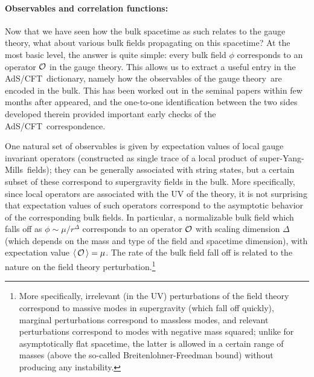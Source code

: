 \documentclass[12pt,a4paper]{article}
\def\AC{AdS/CFT}
\def\GT{gauge theory}
\def\SYM{super-Yang-Mills}
\def\vev#1{\langle\, #1 \, \rangle}
\begin{document}
\paragraph{Observables and correlation functions:}  %
Now that we have seen how the bulk spacetime as such relates to the  \GT, what about various bulk fields propagating on this spacetime?
At the most basic level, the answer is quite simple: every bulk field $\phi$ corresponds to an operator ${\cal O}$ in the \GT.
This allows us to extract a useful entry in the \AC\ dictionary, namely how the observables of the \GT\ are encoded in the bulk.  
This has been worked out in the seminal papers  \cite{Gubser:1998bc,Witten:1998qj} within few months after \cite{Maldacena:1997re} appeared, and the one-to-one identification between the two sides developed therein
provided important early checks of the \AC\ correspondence.

One natural set of observables is given by expectation values of local gauge invariant operators (constructed as single trace of a local product of \SYM\ fields); they can be generally associated with string states, but a certain subset of these correspond to supergravity fields in the bulk.  More specifically, since local operators are associated with the UV of the theory, it is not surprising that expectation values of such operators correspond to the asymptotic behavior of the corresponding bulk fields.  In particular, a normalizable bulk field which falls off as $\phi \sim \mu/r^\Delta$ corresponds to an operator ${\cal O}$ with scaling dimension
$\Delta$ (which depends on the mass and type of the field and spacetime dimension), with expectation value $\vev{{\cal O}} = \mu$.
The rate of the bulk field fall off is related to the nature on the field theory perturbation.\footnote{
More specifically, irrelevant (in the UV) perturbations of the field theory correspond to massive modes in supergravity (which fall off quickly), marginal perturbations correspond to massless modes, and relevant perturbations correspond to modes with negative mass squared; unlike for asymptotically flat spacetime, the latter is allowed in a certain range of masses (above the so-called Breitenlohner-Freedman bound) \cite{Breitenlohner:1982bm,Breitenlohner:1982jf} without producing any instability.}
\end{document}
